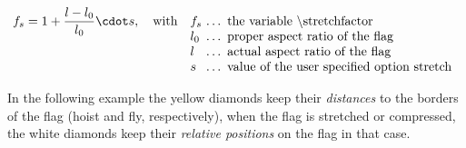 \documentclass[11pt,a4paper,headsepline,fleqn]{scrreprt}
\def\tb{\textbackslash}
\let\tt=\texttt
\begin{document}
\[
f_s = 1 + \frac{l-l_0}{l_0}\cdot s, \quad
\parbox[t]{0.7\textwidth}{%
with\quad
\begin{tabular}[t]{@{}l@{~\dots~}l}
$f_s$ & the variable \tt{\tb stretchfactor} \\
$l_0$ & proper aspect ratio of the flag \\
$l$   & actual aspect ratio of the flag \\
$s$   & value of the user specified option \tt{stretch} \\
\end{tabular}}
\]

In the following example the yellow diamonds keep their
\emph{distances} to the
borders of the flag (hoist and fly, respectively), when the flag is stretched
or compressed,
the white diamonds keep their \emph{relative positions} on the flag
in that case.
\end{document}
